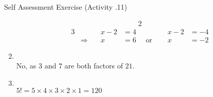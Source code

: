 \documentclass[../notes.tex]{subfiles}
\begin{document}
\begin{exercise}{Self Assessment Exercise (Activity \thechapter.11)}
\begin{enumerate}
\begin{alignat*}{2}
						\end{alignat*}
						\begin{alignat*}{3}
							& \qquad &x - 2 &= 4 \qquad &x - 2 &= -4\\
							& \Rightarrow \quad &x &= 6 \quad \text{ or } \quad &x &= -2 
						\end{alignat*}
					\item {}\\
						No, as $3$ and $7$ are both factors of $21$.
					\item {}\\
						$5! = 5 \times 4 \times 3 \times 2 \times 1 = 120$
				\end{enumerate}
			\end{exercise}
\end{document}

